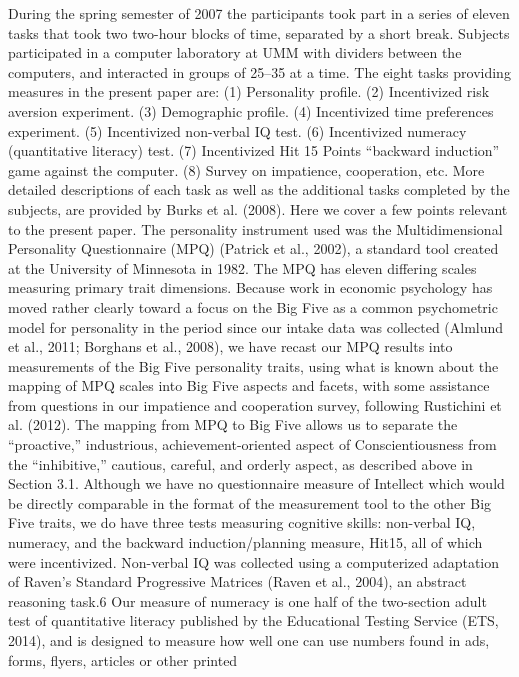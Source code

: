 \documentclass[12pt,a4paper]{article}
\begin{document}
During the spring semester of 2007 the participants took part in a series of eleven tasks that took two two-hour blocks
of time, separated by a short break. Subjects participated in a computer laboratory at UMM with dividers between the
computers, and interacted in groups of 25–35 at a time. The eight tasks providing measures in the present paper are:
(1) Personality profile.
(2) Incentivized risk aversion experiment.
(3) Demographic profile.
(4) Incentivized time preferences experiment.
(5) Incentivized non-verbal IQ test.
(6) Incentivized numeracy (quantitative literacy) test.
(7) Incentivized Hit 15 Points “backward induction” game against the computer.
(8) Survey on impatience, cooperation, etc.
More detailed descriptions of each task as well as the additional tasks completed by the subjects, are provided by Burks
et al. (2008). Here we cover a few points relevant to the present paper.
The personality instrument used was the Multidimensional Personality Questionnaire (MPQ) (Patrick et al., 2002), a
standard tool created at the University of Minnesota in 1982. The MPQ has eleven differing scales measuring primary trait dimensions. Because work in economic psychology has moved rather clearly toward a focus on the Big Five as a common
psychometric model for personality in the period since our intake data was collected (Almlund et al., 2011; Borghans et al.,
2008), we have recast our MPQ results into measurements of the Big Five personality traits, using what is known about
the mapping of MPQ scales into Big Five aspects and facets, with some assistance from questions in our impatience and
cooperation survey, following Rustichini et al. (2012). The mapping from MPQ to Big Five allows us to separate the
“proactive,” industrious, achievement-oriented aspect of Conscientiousness from the “inhibitive,” cautious, careful, and
orderly aspect, as described above in Section 3.1.
Although we have no questionnaire measure of Intellect which would be directly comparable in the format of the measurement tool to the other Big Five traits, we do have three tests measuring cognitive skills: non-verbal IQ, numeracy, and
the backward induction/planning measure, Hit15, all of which were incentivized. Non-verbal IQ was collected using a computerized adaptation of Raven’s Standard Progressive Matrices (Raven et al., 2004), an abstract reasoning task.6 Our measure
of numeracy is one half of the two-section adult test of quantitative literacy published by the Educational Testing Service
(ETS, 2014), and is designed to measure how well one can use numbers found in ads, forms, flyers, articles or other printed
\end{document}
